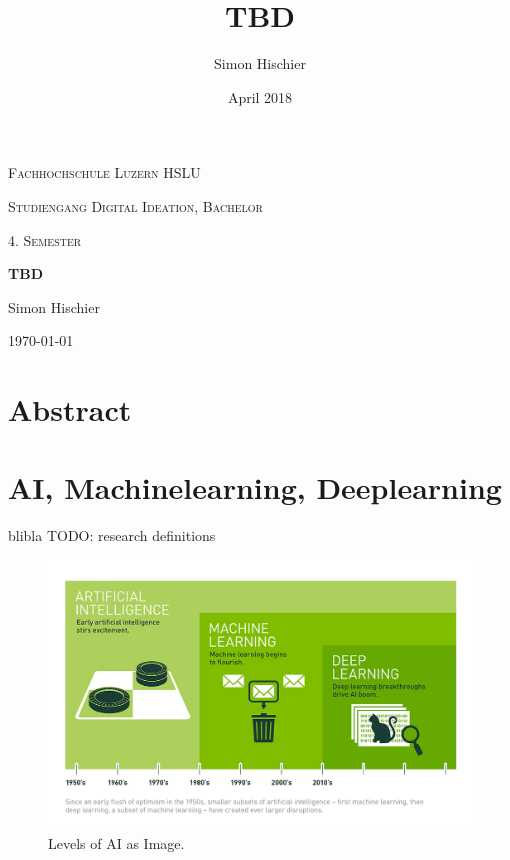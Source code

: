\documentclass[10pt]{article}
\title{TBD}
\author{Simon Hischier}
\date{April 2018}
\begin{document}
\begin{titlepage}
\centering
\vspace{1cm}
	{\scshape\LARGE Fachhochschule Luzern HSLU \par}
	\vspace{1cm}
	{\scshape\Large Studiengang Digital Ideation, Bachelor \par}
	
	{\scshape\Large 4. Semester\par}
	\vspace{1.5cm}
	{\huge\bf TBD\par}
	
	\vspace{10cm}
	{\Large Simon Hischier\par}
	\vfill

	{\large \today\par}
\end{titlepage}

\renewcommand{\contentsname}{Inhalt}
\tableofcontents
\newpage

\section{Abstract}
\section{AI, Machinelearning, Deeplearning}
blibla \cite{MichaelCopeland2016} TODO: research definitions
\begin{figure}[H]
	\includegraphics[width=\textwidth, height=\textheight, keepaspectratio]{Deep_Learning_Icons_R5.png}
	\caption{Levels of AI as Image. \cite{MichaelCopeland2016}}
\end{figure}
\end{document}
